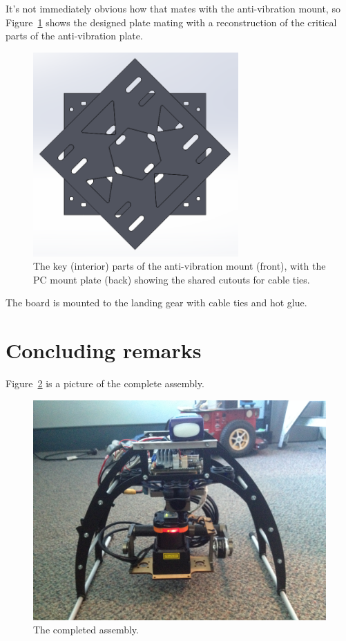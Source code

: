 \documentclass[12pt,oneside,a4paper]{book}
\begin{document}
It's not immediately obvious how that mates with the anti-vibration
mount, so Figure~\ref{fig:pc-avm-mount} shows the designed plate
mating with a reconstruction of the critical parts of the
anti-vibration plate.

\begin{figure}[h]
  \centering
  \includegraphics[width=0.7\textwidth]{figs/pc-avm}
  \caption{The key (interior) parts of the anti-vibration mount (front), with the PC mount plate (back) showing the shared cutouts for cable ties.}
  \label{fig:pc-avm-mount}
\end{figure}
The board is mounted to the landing gear with cable ties and hot glue.
\newpage~\newpage
\section{Concluding remarks}
\label{sec:concluding-remarks}

Figure~\ref{fig:mk2} is a picture of the complete assembly.

\begin{figure}[h!]
  \centering
  \includegraphics[width=\textwidth]{figs/mk2}
  \caption{The completed assembly.}
  \label{fig:mk2}
\end{figure}
\end{document}
